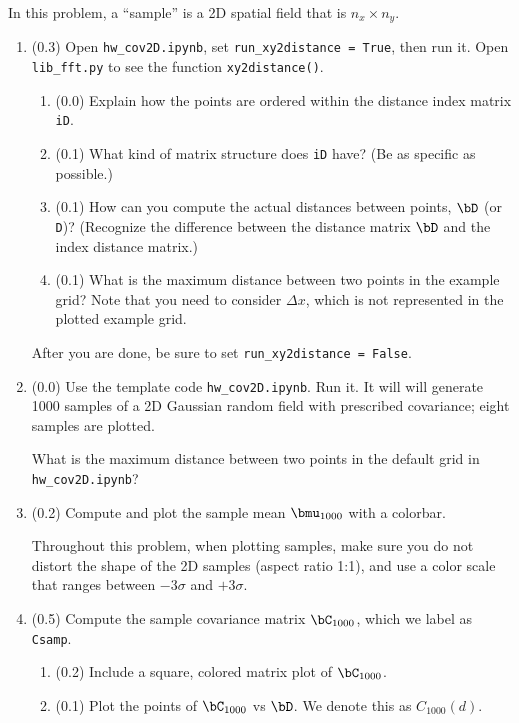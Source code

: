 \documentclass[11pt,titlepage,fleqn]{article}
\newcommand{\tfile}{{\tt hw\_cov2D.ipynb}}
\begin{document}
In this problem, a ``sample'' is a 2D spatial field that is $n_x \times n_y$.
%
\begin{enumerate}
\item (0.3) Open \tfile, set \verb+run_xy2distance = True+, then run it. Open \verb+lib_fft.py+ to see the function \verb+xy2distance()+.
%
\begin{enumerate}
\item (0.0) Explain how the points are ordered within the distance index matrix \verb+iD+.
\item (0.1) What kind of matrix structure does \verb+iD+ have? (Be as specific as possible.)
\item (0.1) How can you compute the actual distances between points, $\bD$ (or \verb+D+)? 
(Recognize the difference between the distance matrix $\bD$ and the index distance matrix.)
\item (0.1) What is the maximum distance between two points in the example grid?
Note that you need to consider $\Delta x$, which is not represented in the plotted example grid.
\end{enumerate}
%
After you are done, be sure to set \verb+run_xy2distance = False+.

\item (0.0) Use the template code \tfile. Run it. It will will generate 1000 samples of a 2D Gaussian random field with prescribed covariance; eight samples are plotted.

What is the maximum distance between two points in the default grid in \tfile?

\item (0.2) Compute and plot the sample mean $\bmu_{1000}$ with a colorbar.

Throughout this problem, when plotting samples, make sure you do not distort the shape of the 2D samples (\ie aspect ratio 1:1), and use a color scale that ranges between $-3\sigma$ and $+3\sigma$.

\item (0.5) Compute the sample covariance matrix $\bC_{1000}$, which we label as \verb+Csamp+.

\begin{enumerate}
\item (0.2) Include a square, colored matrix plot of $\bC_{1000}$.

\item (0.1) Plot the points of $\bC_{1000}$ vs $\bD$. We denote this as $C_{1000}(d)$.



\end{enumerate}
\end{enumerate}
\end{document}
